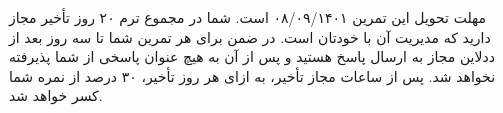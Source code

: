 \noindent
مهلت تحویل این تمرین ۰۸/۰۹/۱۴۰۱ است. شما در مجموع ترم ۲۰ روز تأخیر مجاز دارید که مدیریت آن با خودتان است. در
ضمن برای هر تمرین شما تا سه روز بعد از ددلاین مجاز به ارسال پاسخ هستید و پس از آن به هیچ عنوان پاسخی از شما پذیرفته
نخواهد شد. پس از ساعات مجاز تأخیر، به ازای هر روز تأخیر، ۳۰ درصد از نمره شما کسر خواهد شد.